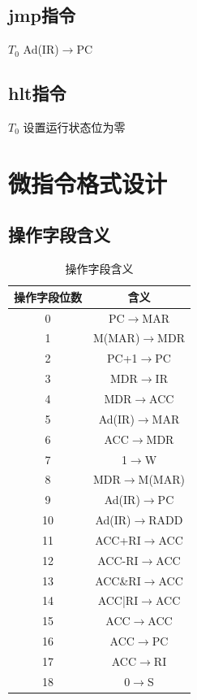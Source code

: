 \documentclass[UTF8]{ctexrep}
\begin{document}
\subsection{jmp指令}

\(T_{0}\) Ad(IR)$\to$PC


\subsection{hlt指令}

\(T_{0}\) 设置运行状态位为零

\section{微指令格式设计}


\subsection{操作字段含义}

\begin{table}[H]
\centering
\begin{tabular}{|c|c|}
\hline
操作字段位数 & 含义                       \\ \hline
0      & PC$\to$MAR      \\ \hline
1      & M(MAR)$\to$MDR  \\ \hline
2      & PC+1$\to$PC     \\ \hline
3      & MDR$\to$IR      \\ \hline
4      & MDR$\to$ACC     \\ \hline
5      & Ad(IR)$\to$MAR  \\ \hline
6      & ACC$\to$MDR     \\ \hline
7      & 1$\to$W         \\ \hline
8      & MDR$\to$M(MAR)  \\ \hline
9      & Ad(IR)$\to$PC   \\ \hline
10     & Ad(IR)$\to$RADD \\ \hline
11     & ACC+RI$\to$ACC  \\ \hline
12     & ACC-RI$\to$ACC  \\ \hline
13     & ACC\&RI$\to$ACC \\ \hline
14     & ACC|RI$\to$ACC  \\ \hline
15     & ACC$\to$ACC     \\ \hline
16     & ACC$\to$PC      \\ \hline
17     & ACC$\to$RI      \\ \hline
18     & 0$\to$S         \\ \hline
\end{tabular}
\caption{操作字段含义}
\end{table}
\end{document}
